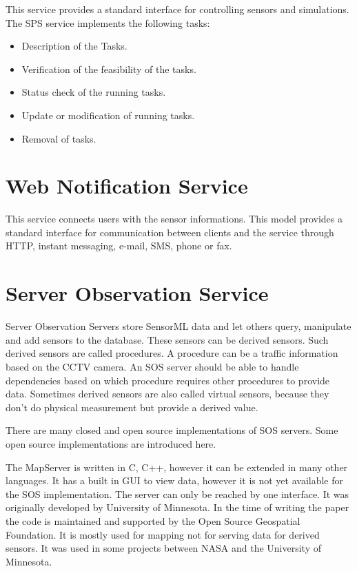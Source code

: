  This service provides a standard interface for controlling sensors and simulations. The SPS service implements the following tasks:
 \begin{itemize}
\item Description of the Tasks.
\item Verification of the feasibility of the tasks.
\item Status check of the running tasks.
\item Update or modification of running tasks.
\item Removal of tasks.
\end{itemize}

\section{Web Notification Service}
This service connects users with the sensor informations. This model provides a standard interface for communication between clients and the service through HTTP, instant messaging, e-mail, SMS, phone or fax. 
 
 
\section{Server Observation Service}

Server Observation Servers store SensorML data and let others query, manipulate and add sensors to the database. These sensors can be derived sensors. Such derived sensors are called procedures. A procedure can be a traffic information based on the CCTV camera. An SOS server should be able to handle dependencies based on which procedure requires other procedures to provide data. Sometimes derived sensors are also called virtual sensors, because they don't do physical measurement but provide a derived value.

There are many closed and open source implementations of SOS servers. Some open source implementations are introduced here.

The MapServer is written in C, C++, however it can be extended in many other languages\cite{mapserver}. It has a built in GUI to view data, however it is not yet available for the SOS implementation. The server can only be reached by one interface. It was originally developed by University of Minnesota. In the time of writing the paper the code is maintained and supported by the Open Source Geospatial Foundation. It is mostly used for mapping not for serving data for derived sensors. It was used in some projects between NASA and the University of Minnesota. 

